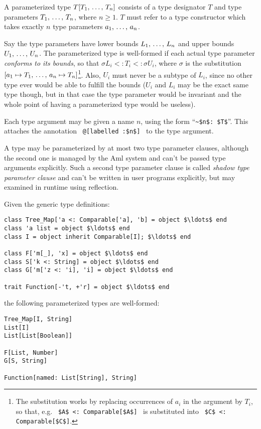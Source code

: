 A parameterized type $T[T_1 ,\, \ldots ,\, T_n]$ consists of a type designator $T$ and type parameters $T_1 ,\, \ldots ,\, T_n$, where $n \geq 1$. $T$ must refer to a type constructor which takes exactly $n$ type parameters $a_1 ,\, \ldots ,\, a_n$. 

Say the type parameters have lower bounds $L_1 ,\, \ldots ,\, L_n$ and upper bounds $U_1 ,\, \ldots ,\, U_n$. The parameterized type is well-formed if each actual type parameter {\em conforms to its bounds}, so that $\sigma L_i <: T_i <: \sigma U_i$, where $\sigma$ is the substitution $[a_1 \mapsto T_1 ,\, \ldots ,\, a_n \mapsto T_n]$\footnote{The substitution works by replacing occurrences of $a_i$ in the argument by $T_i$, so that, e.g. ~\lstinline!$A$ <: Comparable[$A$]!~ is substituted into ~\lstinline!$C$ <: Comparable[$C$]!.}. Also, $U_i$ must never be a subtype of $L_i$, since no other type ever would be able to fulfill the bounds ($U_i$ and $L_i$ may be the exact same type though, but in that case the type parameter would be invariant and the whole point of having a parameterized type would be useless). 

Each type argument may be given a name $n$, using the form ``\lstinline!~$n$: $T$!''. This attaches the annotation ~\lstinline!@[labelled :$n$]!~ to the type argument. 

A type may be parameterized by at most two type parameter clauses, although the second one is managed by the Aml system and can't be passed type arguments explicitly. Such a second type parameter clause is called {\em shadow type parameter clause} and can't be written in user programs explicitly, but may examined in runtime using reflection. 

\example
\label{example:parameterized-types}
Given the generic type definitions: 

\begin{lstlisting}
class Tree_Map['a <: Comparable['a], 'b] = object $\ldots$ end
class 'a list = object $\ldots$ end
class I = object inherit Comparable[I]; $\ldots$ end

class F['m[_], 'x] = object $\ldots$ end
class S['k <: String] = object $\ldots$ end
class G['m['z <: 'i], 'i] = object $\ldots$ end

trait Function[-'t, +'r] = object $\ldots$ end
\end{lstlisting}

the following parameterized types are well-formed: 

\begin{lstlisting}
Tree_Map[I, String]
List[I]
List[List[Boolean]]

F[List, Number]
G[S, String]

Function[named: List[String], String]
\end{lstlisting}

